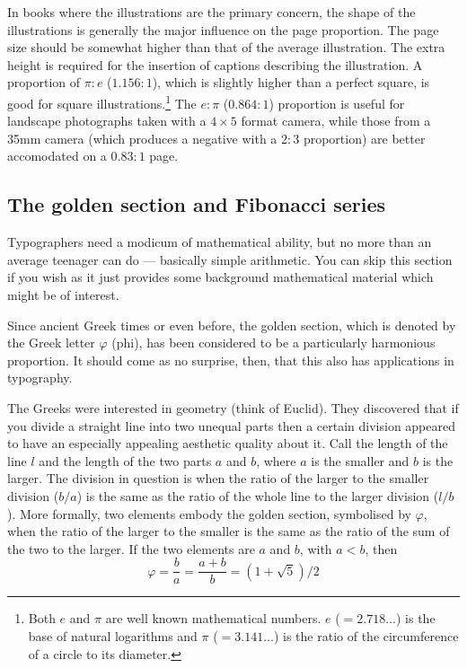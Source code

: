 \documentclass[10pt,letterpaper]{memoir}
\begin{document}
    In books where the illustrations are the primary concern, the shape of
the illustrations is generally the major influence on the page proportion.
The page size should be somewhat higher than that of the average 
illustration.
The extra height is required for the insertion of captions describing the
illustration. A proportion of $\pi{} : e$ ($1.156 : 1$), 
which is slightly higher
than a perfect square, is good for square illustrations.\footnote{Both $e$
and $\pi$ are well known mathematical numbers. $e$ ($= 2.718 \ldots$)
is the base of natural logarithms and $\pi$ ($= 3.141 \ldots$) is the
ratio of the circumference of a circle to its diameter.}
The $e : \pi$
($0.864 : 1$) proportion is useful for landscape photographs  taken with 
a $4 \times 5$
format camera, while those from a 35mm camera (which produces a negative
with a $2 : 3$ proportion) are better accomodated on 
a $0.83 : 1$ page.

\subsection{The golden section and Fibonacci series}

    Typographers need a modicum of mathematical ability, but no more
than an average teenager can do --- basically simple arithmetic. You can
skip this section if you wish as it just provides some background 
mathematical material which might be of interest.

    Since ancient Greek times or even before, the golden section, which
is denoted by the Greek letter $\varphi$ (phi), has been considered to be
a particularly harmonious proportion. It should come as no surprise, then,
that this also has applications in typography.

    The Greeks were interested in geometry (think of Euclid). They discovered
that if you divide a straight line into two unequal parts then a certain
division appeared to have an especially appealing aesthetic quality about it. 
Call the length of the line $l$ and the length of the two parts $a$ and $b$, 
where $a$ is the smaller and $b$ is the larger. The division in question
is when the ratio of the larger to the smaller division ($b/a$) is the same
as the ratio of the whole line to the larger division ($l/b$).
More formally, two elements embody the golden section, symbolised by
$\varphi$, when the ratio of the larger
to the smaller is the same as the ratio of the sum of the two to the larger.
If the two elements are $a$ and $b$, with $a < b$, then
\begin{equation}
\varphi = \frac{b}{a} = \frac{a+b}{b} = (1+\sqrt{5})/2
\end{equation}
\end{document}
